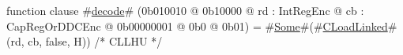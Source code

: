 function clause #\hyperref[zdecode]{decode}# (0b010010 @ 0b10000 @ rd : IntRegEnc @ cb : CapRegOrDDCEnc @ 0b00000001 @ 0b0 @ 0b01) = #\hyperref[zSome]{Some}#(#\hyperref[zCLoadLinked]{CLoadLinked}#(rd, cb, false, H)) /* CLLHU */
